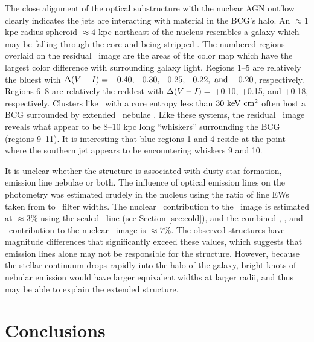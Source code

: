 \documentclass[iop]{emulateapj}
\begin{document}
The close alignment of the optical substructure with the nuclear AGN
outflow clearly indicates the jets are interacting with material in
the BCG's halo. An $\approx 1$ kpc radius spheroid $\approx 4$ kpc
northeast of the nucleus resembles a galaxy which may be falling
through the core and being stripped \citep[see][for
  example]{2007ApJ...671..190S}. The numbered regions overlaid on the
residual \myv\ image are the areas of the color map which have the
largest color difference with surrounding galaxy light. Regions 1--5
are relatively the bluest with $\Delta(V-I) = -0.40, -0.30,
-0.25, -0.22, ~\rm{and} -0.20$, respectively. Regions 6--8 are
relatively the reddest with $\Delta(V-I) =$ +0.10, +0.15, and
+0.18, respectively. Clusters like \rbs\ with a core entropy less than
$30 ~\rm{\mbox{\ensuremath{\rm{keV}}}~\ensuremath{\rm{\mbox{\ensuremath{\rm{cm}}}^2}}}$ often host a BCG surrounded by extended \halpha\ nebulae
\citep[\eg][]{mcdonald10}. Like these systems, the residual
\myi\ image reveals what appear to be 8--10 kpc long ``whiskers''
surrounding the BCG (regions 9--11). It is interesting that blue
regions 1 and 4 reside at the point where the southern jet appears to
be encountering whiskers 9 and 10.

It is unclear whether the structure is associated with dusty star
formation, emission line nebulae or both. The influence of optical
emission lines on the photometry was estimated crudely in the nucleus
using the ratio of line EWs taken from \citet{rbs1} to \hst\ filter
widths. The nuclear \halpha\ contribution to the \myi\ image is
estimated at $\approx 3\%$ using the scaled \hbeta\ line (see Section
\ref{sec:cold}), and the combined \hbeta, \oii, and
\oiii\ contribution to the nuclear \myv\ image is $\approx 7\%$. The
observed structures have magnitude differences that significantly
exceed these values, which suggests that emission lines alone may not
be responsible for the structure. However, because the stellar
continuum drops rapidly into the halo of the galaxy, bright knots of
nebular emission would have larger equivalent widths at larger radii,
and thus may be able to explain the extended structure.

\section{Conclusions}
\label{sec:con}
\end{document}
